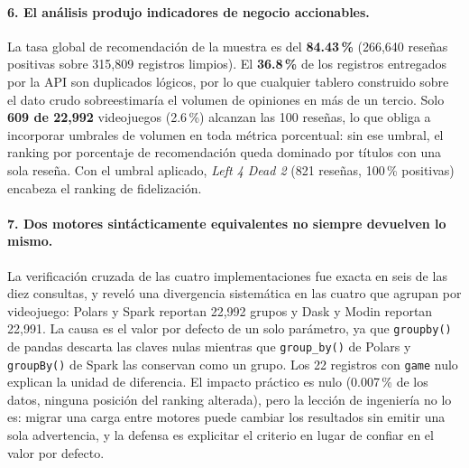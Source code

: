 \paragraph{6. El análisis produjo indicadores de negocio accionables.} La tasa global de recomendación de la muestra es del \textbf{84.43\,\%} (266,640 reseñas positivas sobre 315,809 registros limpios). El \textbf{36.8\,\%} de los registros entregados por la API son duplicados lógicos, por lo que cualquier tablero construido sobre el dato crudo sobreestimaría el volumen de opiniones en más de un tercio. Solo \textbf{609 de 22,992} videojuegos (2.6\,\%) alcanzan las 100 reseñas, lo que obliga a incorporar umbrales de volumen en toda métrica porcentual: sin ese umbral, el ranking por porcentaje de recomendación queda dominado por títulos con una sola reseña. Con el umbral aplicado, \textit{Left 4 Dead 2} (821 reseñas, 100\,\% positivas) encabeza el ranking de fidelización.

\paragraph{7. Dos motores sintácticamente equivalentes no siempre devuelven lo mismo.} La verificación cruzada de las cuatro implementaciones fue exacta en seis de las diez consultas, y reveló una divergencia sistemática en las cuatro que agrupan por videojuego: Polars y Spark reportan 22,992 grupos y Dask y Modin reportan 22,991. La causa es el valor por defecto de un solo parámetro, ya que \texttt{groupby()} de pandas descarta las claves nulas mientras que \texttt{group\_by()} de Polars y \texttt{groupBy()} de Spark las conservan como un grupo. Los 22 registros con \texttt{game} nulo explican la unidad de diferencia. El impacto práctico es nulo (0.007\,\% de los datos, ninguna posición del ranking alterada), pero la lección de ingeniería no lo es: migrar una carga entre motores puede cambiar los resultados sin emitir una sola advertencia, y la defensa es explicitar el criterio en lugar de confiar en el valor por defecto.

